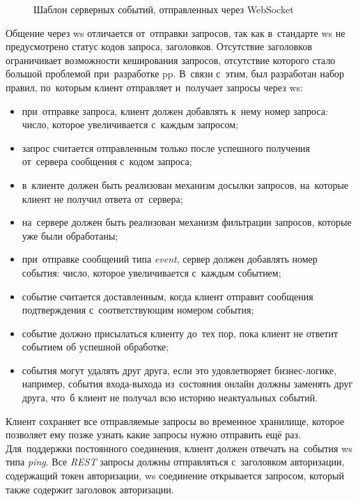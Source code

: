 \begin{figure}[h]
	
   \caption{Шаблон серверных событий, отправленных через WebSocket}
   \label{sec:development:arch:pp:communication:code:ws:response}
\end{figure}

Общение через \gls{ws} отличается от~отправки запросов, так как в~стандарте \gls{ws} не предусмотрено статус кодов запроса, заголовков. Отсутствие заголовков ограничивает возможности кеширования запросов, отсутствие которого стало большой проблемой при~разработке \gls{pp}. В~связи с~этим, был разработан набор правил, по~которым клиент отправляет и~получает запросы через \gls{ws}:

\begin{itemize}
	\item при~отправке запроса, клиент должен добавлять к~нему номер запроса: число, которое увеличивается с~каждым запросом;
	\item запрос считается отправленным только после успешного получения от~сервера сообщения с~кодом запроса;
	\item в~клиенте должен быть реализован механизм досылки запросов, на~которые клиент не получил ответа от~сервера;
	\item на~сервере должен быть реализован механизм фильтрации запросов, которые уже были обработаны;
	\item при~отправке сообщений типа \textit{event}, сервер должен добавлять номер события: число, которое увеличивается с~каждым событием;
	\item событие считается доставленным, когда клиент отправит сообщения подтверждения с~соответствующим номером события;
	\item событие должно присылаться клиенту до~тех пор, пока клиент не ответит событием об успешной обработке;
	\item события могут удалять друг друга, если это удовлетворяет бизнес-логике, например, события входа-выхода из~состояния онлайн должны заменять друг друга, что~б клиент не получал всю историю неактуальных событий.
\end{itemize}

Клиент сохраняет все отправляемые запросы во временное хранилище, которое позволяет ему позже узнать какие запросы нужно отправить ещё раз. Для~поддержки постоянного соединения, клиент должен отвечать на~события \gls{ws} типа \textit{ping}. Все \textit{REST} запросы должны отправляться с~заголовком авторизации, содержащий токен авторизации, \gls{ws} соединение открывается запросом, который также содержит заголовок авторизации.